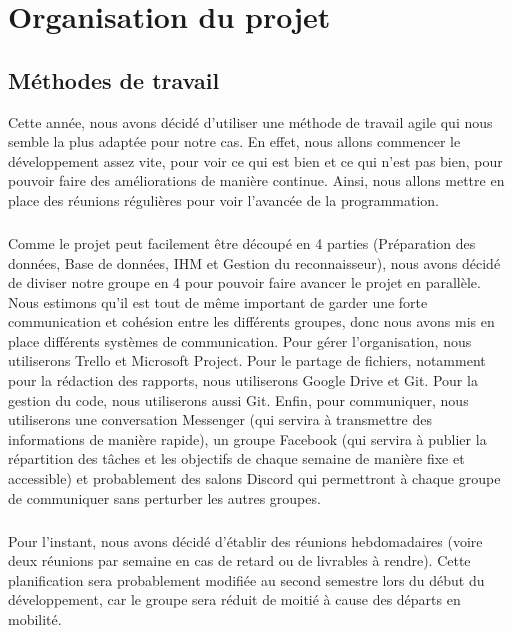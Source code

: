 \chapter{Organisation du projet}

\section{Méthodes de travail}

Cette année, nous avons décidé d’utiliser une méthode de travail agile qui nous
semble la plus adaptée pour notre cas. En effet, nous allons commencer le développement
assez vite, pour voir ce qui est bien et ce qui n’est pas bien, pour pouvoir faire des
améliorations de manière continue. Ainsi, nous allons mettre en place des réunions
régulières pour voir l’avancée de la programmation.

\paragraph{}
Comme le projet peut facilement être découpé en 4 parties (Préparation des données,
Base de données, IHM et Gestion du reconnaisseur), nous avons décidé de diviser notre
groupe en 4 pour pouvoir faire avancer le projet en parallèle. Nous estimons qu’il est
tout de même important de garder une forte communication et cohésion entre les différents
groupes, donc nous avons mis en place différents systèmes de communication. Pour gérer
l’organisation, nous utiliserons Trello et Microsoft Project. Pour le partage de fichiers,
notamment pour la rédaction des rapports, nous utiliserons Google Drive et Git.
Pour la gestion du code, nous utiliserons aussi Git. Enfin, pour communiquer, nous
utiliserons une conversation Messenger (qui servira à transmettre des informations de
manière rapide), un groupe Facebook (qui servira à publier la répartition des tâches et
les objectifs de chaque semaine de manière fixe et accessible) et probablement des salons
Discord qui permettront à chaque groupe de communiquer sans perturber les autres groupes.

\paragraph{}
Pour l’instant, nous avons décidé d’établir des réunions hebdomadaires (voire deux réunions
par semaine en cas de retard ou de livrables à rendre). Cette planification sera probablement
modifiée au second semestre lors du début du développement, car le groupe sera réduit de
moitié à cause des départs en mobilité.

